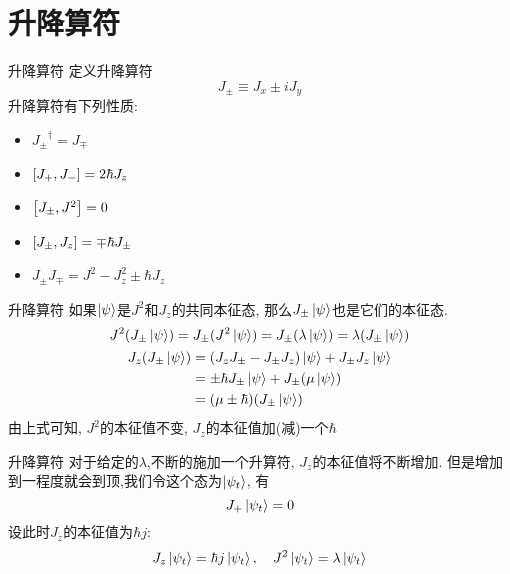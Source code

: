 \documentclass{beamer}
\begin{document}
\section{升降算符}

\begin{frame}{升降算符}
定义升降算符
\begin{equation}
J_{\pm} \equiv J_x \pm i J_y
\end{equation}
升降算符有下列性质:
\begin{itemize}
\item ${J_\pm}^\dag = J_\mp$
\item $\comm{J_+}{J_-} = 2 \hbar J_z$
\item $\comm{J_\pm}{J^2} = 0$
\item $\comm{J_\pm}{J_z} = \mp \hbar J_\pm$
\item $J_\pm J_\mp = J^2 - J_z^2 \pm \hbar J_z$
\end{itemize}
\end{frame}

\begin{frame}{升降算符}
如果$\ket{\psi}$是$J^2$和$J_z$的共同本征态, 那么$J_\pm \ket{\psi}$也是它们的本征态.
\begin{gather}
J^2(J_\pm \ket{\psi}) = J_\pm (J^2 \ket{\psi}) = J_\pm  (\lambda \ket{\psi}) = \lambda (J_\pm \ket{\psi}) \\
\begin{split}
J_z (J_\pm \ket{\psi}) &= (J_z J_\pm - J_\pm J_z) \ket{\psi} + J_\pm J_z \ket{\psi} \\
  &= \pm \hbar J_\pm \ket{\psi} + J_\pm (\mu \ket{\psi}) \\
  &= (\mu \pm \hbar) (J_\pm \ket{\psi})
\end{split}
\end{gather}
由上式可知, $J^2$的本征值不变, $J_z$的本征值加(减)一个$\hbar$
\end{frame}

\begin{frame}{升降算符}
对于给定的$\lambda$,不断的施加一个升算符, $J_z$的本征值将不断增加. 但是增加到一程度就会到顶,我们令这个态为$\ket{\psi_t}$, 有
\begin{equation}
J_+ \ket{\psi_t} = 0
\end{equation}
设此时$J_z$的本征值为$\hbar j$:
\begin{equation}
J_z \ket{\psi_t} = \hbar j \ket{\psi_t}, \quad J^2 \ket{\psi_t} = \lambda \ket{\psi_t}
\end{equation}

\end{frame}
\end{document}
